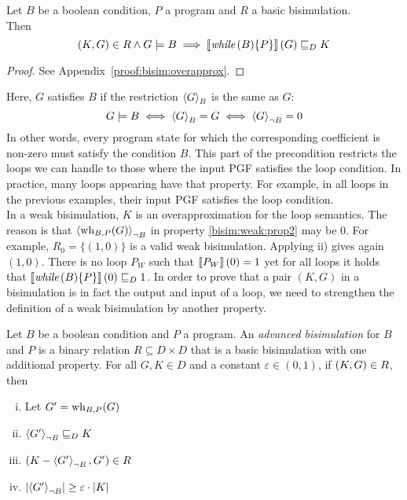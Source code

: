 \begin{theorem}[label=theo:bisim:overapprox]
	Let $B$ be a boolean condition, $P$ a program and $R$ a basic bisimulation. \\
	Then \[ \left( K, G \right) \in R \land G \models B
		\implies \left\llbracket \textit{while}\,(B) \{P\} \right\rrbracket(G) \sqsubseteq_{D} K \]
	\begin{proof}
		See Appendix~\ref{proof:bisim:overapprox}.
	\end{proof}
\end{theorem}

Here, $G$ satisfies $B$ if the restriction $\left\langle G \right\rangle_{B}$ is the same as $G$:
\[ G \models B \iff \left\langle G \right\rangle_{B} = G \iff \left\langle G \right\rangle_{\lnot B} = 0 \]
In other words, every program state for which the corresponding coefficient is non-zero must satisfy the condition $B$.
This part of the precondition restricts the loops we can handle to those where the input PGF satisfies the loop condition.
In practice, many loops appearing have that property.
For example, in all loops in the previous examples, their input PGF satisfies the loop condition. \\
In a weak bisimulation, $K$ is an overapproximation for the loop semantics.
The reason is that $\left\langle \operatorname{wh}_{B, P}(G) \right\rangle_{\lnot B}$ in property \ref{bisim:weak:prop2} may be 0.
For example, $R_{0} = \{ (1, 0) \}$ is a valid weak bisimulation.
Applying ii) gives again $(1, 0)$.
There is no loop $P_W$ such that $\left\llbracket P_W \right\rrbracket(0) = 1$ yet for all loops it holds that $\left\llbracket \textit{while}\,(B) \{P\} \right\rrbracket(0) \sqsubseteq_{D} 1$.
In order to prove that a pair $(K, G)$ in a bisimulation is in fact the output and input of a loop, we need to strengthen the definition of a weak bisimulation by another property.

\begin{definition}
	Let $B$ be a boolean condition and $P$ a program.
	An \emph{advanced bisimulation} for $B$ and $P$ is a binary relation $R \subseteq D \times D$
	that is a basic bisimulation with one additional property.
	For all $G, K \in D$ and a constant $\varepsilon \in (0, 1)$, if $\left( K, G \right) \in R$, then
	\begin{enumerate}[i)]
		\item[] Let $G' = \operatorname{wh}_{B, P}(G)$
		\item $\left\langle G' \right\rangle_{\lnot B} \sqsubseteq_{D} K$	\label{bisim:strong:prop1}
		\item $\left( K - \left\langle G' \right\rangle_{\lnot B}, G' \right) \in R$	\label{bisim:strong:prop2}
		\item $\left| \left\langle G' \right\rangle_{\lnot B}\right| \geq \varepsilon \cdot \left| K \right|$\label{bisim:strong:prop3}
	\end{enumerate}
\end{definition}

